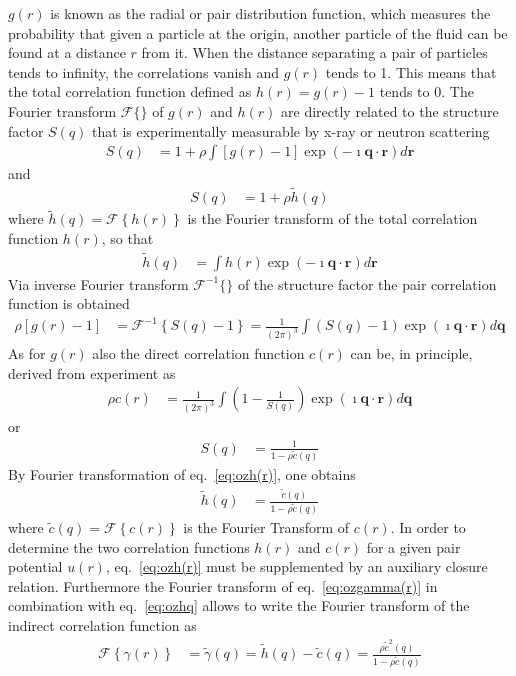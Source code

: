  $g(r)$ is known as the radial or pair distribution  function, which measures the
probability that given a particle at the origin, another particle of
the fluid can be found at a distance $r$ from it. When the distance
separating a pair of particles tends to infinity, the correlations
vanish and $g(r)$ tends to 1. This means that the total correlation
function defined as $h(r)=g(r)-1$ tends to 0. The Fourier transform
$\mathscr{F} \{\}$ of $g(r)$ and $h(r)$ are directly related to the
structure factor $S(q)$ that is experimentally measurable by x-ray
or neutron scattering
\begin{align}
S(q)&=1+\rho \int
\left[g(r)-1\right]\exp\left(-\imath\mathbf{q}\cdot
\mathbf{r}\right) d\mathbf{r}
\end{align}
and
\begin{align}
S(q) &= 1+ \rho  \tilde{h}(q)
\end{align}
where $\tilde{h}(q)=\mathscr{F} \left\{h(r)\right\}$  is the Fourier
transform of the total correlation function $h(r)$, so that
\begin{align}
\tilde{h}(q) &= \int h(r) \exp\left(-\imath\mathbf{q}\cdot
\mathbf{r}\right) d\mathbf{r}
\end{align}
Via inverse Fourier transform $\mathscr{F}^{-1} \{\}$ of the
structure factor the pair correlation function is obtained
\begin{align}
\rho \left[ g(r)-1\right] &=\mathscr{F}^{-1} \left\{S(q)-1\right\} =
\frac{1}{(2\pi)^3} \int \left( S(q)-1
\right)\exp\left(\imath\mathbf{q}\cdot \mathbf{r}\right) d\mathbf{q}
\end{align}
As for $g(r)$ also the direct correlation function $c(r)$ can be, in
principle, derived from experiment as
\begin{align}
\rho c(r) &= \frac{1}{(2\pi)^3} \int \left(1-\frac{1}{S(q)}\right)
\exp\left(\imath\mathbf{q}\cdot \mathbf{r}\right) d\mathbf{q}
\end{align}
or
\begin{align}
S(q) &= \frac{1}{1-\rho \tilde{c}(q)} \label{eq:ozSq}
\end{align}
By Fourier transformation of eq.\ \ref{eq:ozh(r)}, one obtains
\begin{align}
\tilde{h}(q) &= \frac{\tilde{c}(q)}{1-\rho\tilde{c}(q)}
\label{eq:ozhq}
\end{align}
where $\tilde{c}(q)=\mathscr{F}\left\{c(r)\right\}$ is the Fourier
Transform of $c(r)$. In order to determine the two correlation
functions $h(r)$ and $c(r)$ for a given pair potential $u(r)$, eq.\
\ref{eq:ozh(r)} must be supplemented by an auxiliary closure
relation. Furthermore the Fourier transform of eq.\
\ref{eq:ozgamma(r)} in combination with eq.\ \ref{eq:ozhq} allows to
write the Fourier transform of the indirect correlation function as
\begin{align}
\mathscr{F} \left\{\gamma(r)\right\} &= \tilde{\gamma}(q)  =
\tilde{h}(q) - \tilde{c}(q) =
\frac{\rho\tilde{c}^2(q)}{1-\rho\tilde{c}(q)} \label{eq:ozg(q)}
\end{align}


